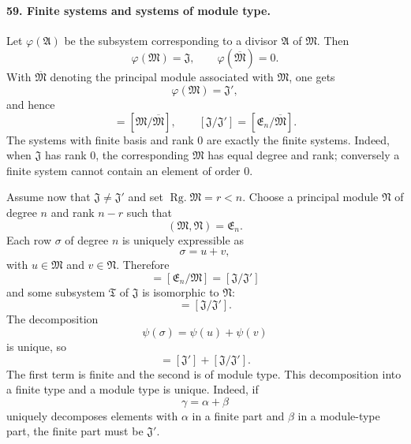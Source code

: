 \documentclass[11pt]{article}
\newcommand{\Rg}{\operatorname{Rg.}}
\begin{document}
\paragraph{59. Finite systems and systems of module type.}
Let $\varphi(\mathfrak A)$ be the subsystem corresponding to a divisor $\mathfrak A$ of $\mathfrak M$. Then
\begin{equation}
  \varphi(\mathfrak M)=\mathfrak J,
  \qquad
  \varphi(\overline{\mathfrak M})=0.
\tag{96}
\end{equation}
With $\overline{\mathfrak M}$ denoting the principal module associated with $\mathfrak M$, one gets
\begin{equation}
  \varphi(\mathfrak M)=\mathfrak J',
\tag{97}
\end{equation}
and hence
\begin{equation}
  [\mathfrak J']=[\mathfrak M/\overline{\mathfrak M}],
  \qquad
  [\mathfrak J/\mathfrak J']=[\mathfrak E_n/\overline{\mathfrak M}].
\tag{98}
\end{equation}
The systems with finite basis and rank $0$ are exactly the finite systems. Indeed, when $\mathfrak J$ has rank $0$, the corresponding $\mathfrak M$ has equal degree and rank; conversely a finite system cannot contain an element of order $0$.

Assume now that $\mathfrak J\ne\mathfrak J'$ and set $\Rg\mathfrak M=r<n$. Choose a principal module $\mathfrak N$ of degree $n$ and rank $n-r$ such that
\begin{equation}
  (\mathfrak M,\mathfrak N)=\mathfrak E_n.
\tag{99}
\end{equation}
Each row $\sigma$ of degree $n$ is uniquely expressible as
\begin{equation}
  \sigma=u+v,
\tag{100}
\end{equation}
with $u\in\mathfrak M$ and $v\in\mathfrak N$. Therefore
\begin{equation}
  [\mathfrak N]=[\mathfrak E_n/\mathfrak M]=[\mathfrak J/\mathfrak J']
\tag{101}
\end{equation}
and some subsystem $\mathfrak T$ of $\mathfrak J$ is isomorphic to $\mathfrak N$:
\begin{equation}
  [\mathfrak T]=[\mathfrak J/\mathfrak J'].
\tag{102}
\end{equation}
The decomposition
\begin{equation}
  \psi(\sigma)=\psi(u)+\psi(v)
\tag{103}
\end{equation}
is unique, so
\begin{equation}
  [\mathfrak J]=[\mathfrak J']+[\mathfrak J/\mathfrak J'].
\tag{104}
\end{equation}
The first term is finite and the second is of module type. This decomposition into a finite type and a module type is unique. Indeed, if
\begin{equation}
  \gamma=\alpha+\beta
\tag{105}
\end{equation}
uniquely decomposes elements with $\alpha$ in a finite part and $\beta$ in a module-type part, the finite part must be $\mathfrak J'$.
\end{document}
